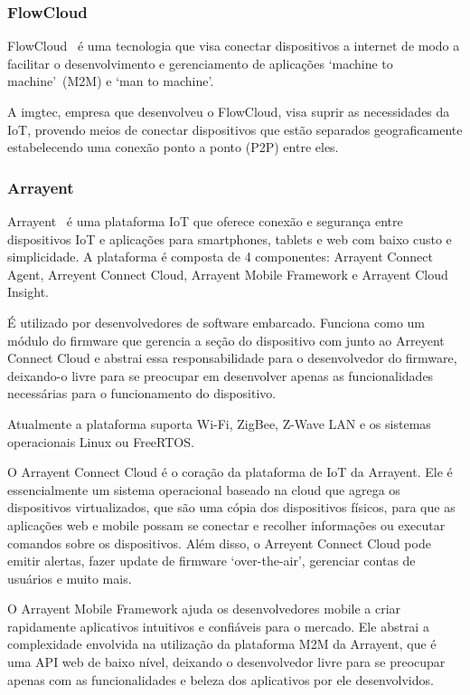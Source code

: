\subsubsection{FlowCloud}
FlowCloud~\cite{flowcloud} é uma tecnologia que visa conectar dispositivos a internet de modo a facilitar o
desenvolvimento e gerenciamento de aplicações \lq machine to machine\rq\ (M2M) e \lq man to machine\rq.

A imgtec, empresa que desenvolveu o FlowCloud, visa suprir as necessidades da IoT, provendo meios de conectar
dispositivos que estão separados geograficamente estabelecendo uma conexão ponto a ponto (P2P) entre eles.

\subsubsection{Arrayent}
Arrayent~\cite{arrayent} é uma plataforma IoT que oferece conexão e segurança entre dispositivos IoT e aplicações
para  smartphones, tablets e web com baixo custo e simplicidade. A plataforma é composta de 4 componentes:
Arrayent Connect Agent, Arreyent Connect Cloud, Arrayent Mobile Framework e Arrayent Cloud Insight.

É utilizado por desenvolvedores de software embarcado. Funciona como um módulo do firmware que gerencia a
seção do dispositivo com junto ao Arreyent Connect Cloud e abstrai essa responsabilidade para o desenvolvedor
do firmware, deixando-o livre para se preocupar em desenvolver apenas as funcionalidades necessárias para o
funcionamento do dispositivo.

Atualmente a plataforma suporta Wi-Fi, ZigBee, Z-Wave LAN e os sistemas operacionais Linux ou FreeRTOS.

O Arrayent Connect Cloud é o coração da plataforma de IoT da Arrayent. Ele é essencialmente um sistema
operacional baseado na cloud que agrega os dispositivos virtualizados, que são uma cópia dos dispositivos
físicos, para que as aplicações web e mobile possam se conectar e recolher informações ou executar comandos
sobre os dispositivos. Além disso, o Arreyent Connect Cloud pode emitir alertas, fazer update de firmware
\lq over-the-air\rq, gerenciar contas de usuários e muito mais.

O Arrayent Mobile Framework ajuda os desenvolvedores mobile a criar rapidamente aplicativos intuitivos e
confiáveis para o mercado. Ele abstrai a complexidade envolvida na utilização da plataforma M2M da Arrayent,
que é uma API web de baixo nível, deixando o desenvolvedor livre para se preocupar apenas com as funcionalidades
e beleza dos aplicativos por ele desenvolvidos.

